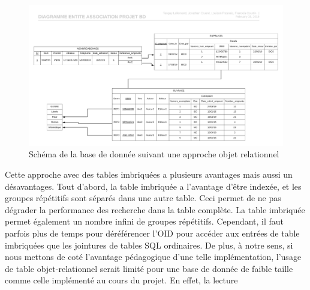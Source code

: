 \documentclass[11pt,a4paper]{article}
\begin{document}
\begin{landscape}
    \begin{figure}[h]
        \centering
        \includegraphics[width=26cm]{img/projet_megadonnees_v2.png}
        \caption{Schéma de la base de donnée suivant une approche objet relationnel}
        \label{or}
    \end{figure}
\end{landscape}

Cette approche avec des tables imbriquées a plusieurs avantages mais aussi un désavantages. Tout d'abord, la table imbriquée a l'avantage d'être indexée, et les groupes répétitifs sont séparés dans une autre table. Ceci permet de ne pas dégrader la performance des recherche dans la table complète. La table imbriquée permet également un nombre infini de groupes répétitifs. Cependant, il faut parfois plus de temps pour déréférencer l'OID pour accéder aux entrées de table imbriquées que les jointures de tables SQL ordinaires. De plus, à notre sens, si nous mettons de coté l'avantage pédagogique d'une telle implémentation, l'usage de table objet-relationnel serait limité pour une base de donnée de faible taille comme celle implémenté au cours du projet. En effet, la lecture 
\end{document}
